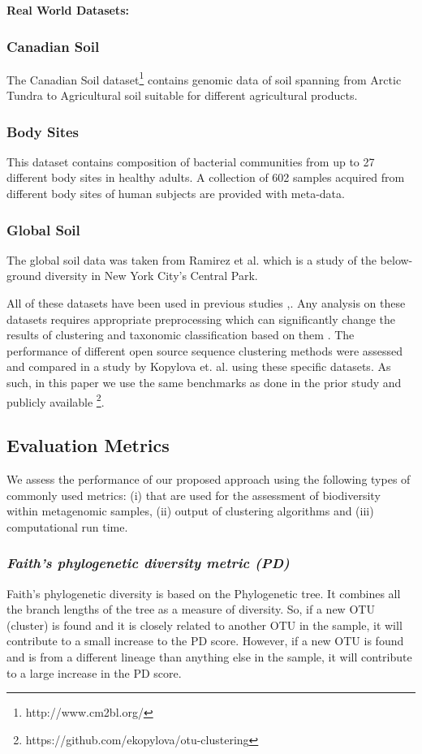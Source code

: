 \documentclass[10pt, conference, compsocconf]{IEEEtran}
\begin{document}
\textbf{Real World Datasets:}

\subsubsection{Canadian Soil}
The Canadian Soil dataset\footnote{http://www.cm2bl.org/} contains 
genomic data of soil spanning from Arctic 
Tundra to Agricultural soil suitable for different 
agricultural products.  %

\subsubsection{Body Sites}
This dataset contains composition of 
bacterial communities from up to 27 different 
body sites in healthy adults. A collection of 602 samples acquired from different body sites of human subjects are provided with meta-data.

\subsubsection{Global Soil}
The global soil data was taken from Ramirez et al. \cite{MARglobalSoil} which is a study of the below-ground diversity in New York City's Central Park. 

All of these datasets have been used in 
previous studies \cite{MARmockDatasetRef},\cite{MARopenDeNovo}. Any 
analysis on these datasets requires 
appropriate preprocessing which can significantly change the 
results of clustering and taxonomic classification 
based on them \cite{MARmockDatasetRef}. The performance of 
different open source sequence clustering methods were 
assessed and compared in a  study by Kopylova et. al. \cite{MARopenDeNovo} using 
these specific datasets. As such, in this paper we use the same 
benchmarks as done in the prior study and publicly available \footnote{https://github.com/ekopylova/otu-clustering}.


\subsection{\textbf{Evaluation Metrics}}

We assess the performance of our proposed approach using 
the following types of  commonly used metrics: (i) that are used 
for the assessment of biodiversity
within metagenomic samples, (ii) output of clustering algorithms 
and (iii) computational run time. 


\subsubsection{\textit{Faith’s phylogenetic diversity metric (PD)}}
Faith’s phylogenetic diversity \cite{MARfaith1992conservation} is based on the Phylogenetic tree. It combines all 
the branch lengths of the tree as a measure of diversity. So, if a new 
OTU (cluster)  is found and it is closely related to another OTU in the sample, it will contribute to 
a small increase to the PD score. However, if a new OTU is found and is 
from a different lineage than anything else in the sample, it will contribute to a large 
increase in the PD score. %
\end{document}
